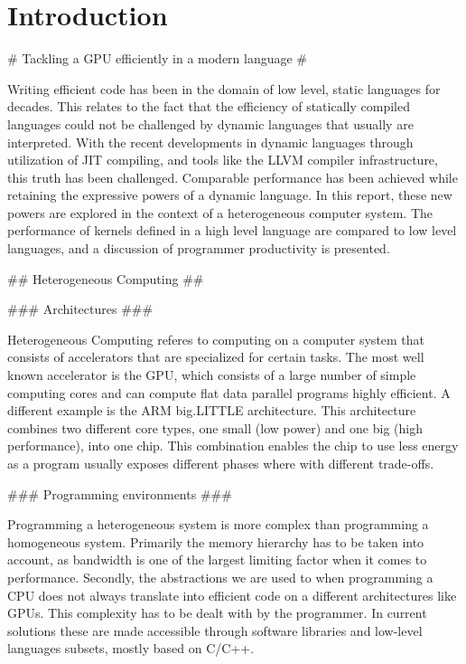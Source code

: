 
\chapter{Introduction}





\begin{markdown}
# Tackling a GPU efficiently in a modern language #

Writing efficient code has been in the domain of low level, static
languages for decades. This relates to the fact that the efficiency of
statically compiled languages could not be challenged by dynamic
languages that usually are interpreted.  With the recent developments
in dynamic languages through utilization of \gls{JIT} compiling, and
tools like the \gls{LLVM} \cite{llvm} compiler infrastructure, this
truth has been challenged. Comparable performance has been achieved
while retaining the expressive powers of a dynamic language. In this
report, these new powers are explored in the context of a
heterogeneous computer system. The performance of kernels defined in a
high level language are compared to low level languages, and a
discussion of programmer productivity is presented.

## Heterogeneous Computing ##

### Architectures ###

Heterogeneous Computing referes to computing on a computer system that
consists of accelerators that are specialized for certain tasks. The
most well known accelerator is the \gls{GPU}, which consists of a
large number of simple computing cores and can compute flat data
parallel programs highly efficient. A different example is the ARM
big.LITTLE \cite{big.LITTLE} architecture. This architecture combines
two different core types, one small (low power) and one big (high
performance), into one chip. This combination enables the chip to use
less energy as a program usually exposes different phases where with
different trade-offs.

### Programming environments ###

Programming a heterogeneous system is more complex than programming a
homogeneous system. Primarily the memory hierarchy has to be taken
into account, as bandwidth is one of the largest limiting factor when
it comes to performance. Secondly, the abstractions we are used to
when programming a \gls{CPU} does not always translate into efficient
code on a different architectures like \gls{GPU}s. This complexity has
to be dealt with by the programmer. In current solutions these are
made accessible through software libraries and low-level languages
subsets, mostly based on C/C++.


\end{markdown}
